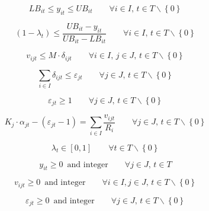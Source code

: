 \documentclass[a4paper,12pt,titlepage]{article}
\begin{document}
  \begin{equation*}
 LB_{it} \leq y_{it} \leq UB_{it} \qquad \forall i\in I,\,t\in T\backslash\left\lbrace 0\right\rbrace
 \tag{4}
 \end{equation*}
 
 \begin{equation*}
 \left(1-\lambda_t\right) \leq\dfrac{UB_{it} -y_{it}}{UB_{it} - LB_{it}} \qquad \forall i\in I,\,t\in T\backslash\left\lbrace 0\right\rbrace
 \tag{5}
 \end{equation*}
 
  \begin{equation*}
 v_{ijt} \leq M\cdot \delta_{ijt} \qquad \forall i\in I,\,j\in J,\,t\in T\backslash\left\lbrace 0\right\rbrace
 \tag{6}
 \end{equation*}
 
  \begin{equation*}
 \sum_{i\in I} \delta_{ijt} \leq \varepsilon_{jt} \qquad \forall j\in J,\,t\in T\backslash\left\lbrace 0\right\rbrace
 \tag{7}
 \end{equation*}
 
  \begin{equation*}
 \varepsilon_{jt}\geq 1 \qquad \forall j\in J,\,t\in T\backslash\left\lbrace 0\right\rbrace
 \tag{8}
 \end{equation*}
 
  \begin{equation*}
 K_j\cdot \alpha_{jt} - \left( \varepsilon_{jt}-1\right) =\sum_{i\in I} \dfrac{v_{ijt}}{R_i} \qquad \forall j\in J,\,t\in T\backslash\left\lbrace 0\right\rbrace
 \tag{9}
 \end{equation*}
 
 \begin{equation*}
 \lambda_t \in \left[0,1 \right] \qquad \forall t\in T\backslash\left\lbrace 0\right\rbrace
 \tag{10}
 \end{equation*}
 
  \begin{equation*}
 y_{it} \geq 0\,\,\,\text{and integer} \qquad \forall j\in J,\,t\in T
 \tag{11}
 \end{equation*}
 
\begin{equation*}
 v_{ijt} \geq 0\,\,\,\text{and integer} \qquad \forall i\in I, j\in J,\,t\in T\backslash\left\lbrace 0\right\rbrace
 \tag{12}
 \end{equation*}
 
  \begin{equation*}
  \varepsilon_{jt} \geq 0\,\,\,\text{and integer} \qquad \forall j\in J,\,t\in T\backslash\left\lbrace 0\right\rbrace
 \tag{13}
 \end{equation*}
 
\end{document}
